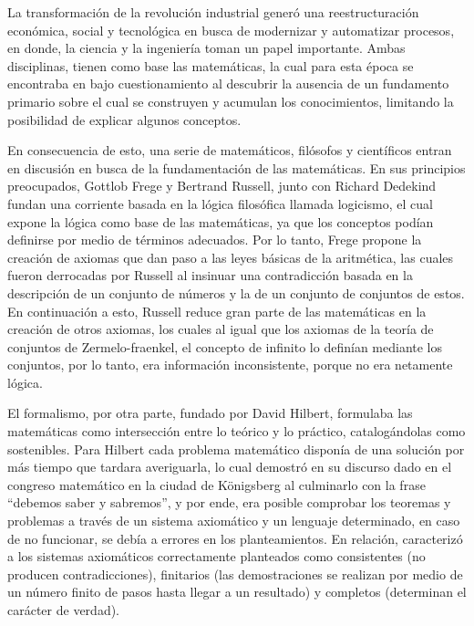 \documentclass[12pt]{article}
\begin{document}
La transformación de la revolución industrial generó una reestructuración económica, social y tecnológica en busca de modernizar y automatizar procesos, en donde, la ciencia y la ingeniería toman un papel importante. Ambas disciplinas, tienen como base las matemáticas, la cual para esta época se encontraba en bajo cuestionamiento al descubrir la ausencia de un fundamento primario sobre el cual se construyen y acumulan los conocimientos, limitando la posibilidad de explicar algunos conceptos.

\vspace{15PT}
En consecuencia de esto, una serie de matemáticos, filósofos y científicos entran en discusión en busca de la fundamentación de las matemáticas. En sus principios preocupados, Gottlob Frege y Bertrand Russell, junto con Richard Dedekind fundan una corriente basada en la lógica filosófica llamada logicismo, el cual expone la lógica como base de las matemáticas, ya que los conceptos podían definirse por medio de términos adecuados. Por lo tanto, Frege propone la creación de axiomas que dan paso a las leyes básicas de la aritmética, las cuales fueron derrocadas por Russell al insinuar una contradicción basada en la descripción de un conjunto de números y la de un conjunto de conjuntos de estos. En continuación a esto, Russell reduce gran parte de las matemáticas en la creación de otros axiomas, los cuales al igual que los axiomas de la teoría de conjuntos de Zermelo-fraenkel, el concepto de infinito lo definían mediante los conjuntos, por lo tanto, era información inconsistente, porque no era netamente lógica.

\vspace{15PT}
El formalismo, por otra parte, fundado por David Hilbert, formulaba las matemáticas como intersección entre lo teórico y lo práctico, catalogándolas como sostenibles. Para Hilbert cada problema matemático disponía de una solución por más tiempo que tardara averiguarla, lo cual demostró en su discurso dado en el congreso matemático en la ciudad de Königsberg al culminarlo con la frase “debemos saber y sabremos”, y por ende, era posible comprobar los teoremas y problemas a través de un sistema axiomático y un lenguaje determinado, en caso de no funcionar, se debía a errores en los planteamientos. En relación, caracterizó a los sistemas axiomáticos correctamente planteados como consistentes (no producen contradicciones), finitarios (las demostraciones se realizan por medio de un número finito de pasos hasta llegar a un resultado)  y completos (determinan el carácter de verdad).
\end{document}
